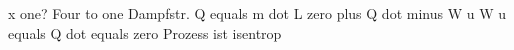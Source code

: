 x one? Four to one  
Dampfstr. Q equals m dot L zero plus Q dot minus W u  
W u equals Q dot equals zero  
Prozess ist isentrop
